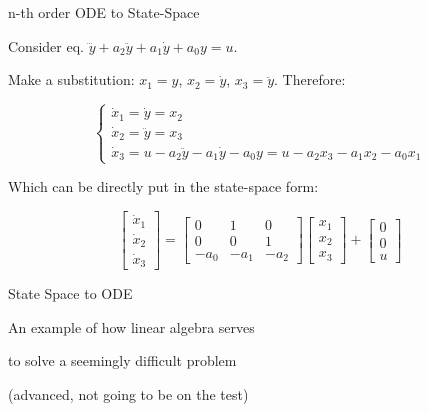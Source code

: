 \documentclass{beamer}
\begin{document}
\begin{frame}{n-th order ODE to State-Space}
\begin{flushleft}

Consider eq. $\dddot{y} + a_2 \ddot{y} + a_1 \dot{y} + a_0 y =u$.

\bigskip

Make a substitution: $x_1 = y$, $x_2 = \dot{y}$, $x_3 = \ddot{y}$. Therefore:

\begin{equation}
    \begin{cases}
        \dot{x}_1 = \dot{y} = x_2 \\
        \dot{x}_2 = \ddot{y} = x_3 \\
        \dot{x}_3 =  u-a_2 \ddot{y} - a_1 \dot{y} - a_0 y = 
        u-a_2 x_3 - a_1 x_2 - a_0 x_1
    \end{cases}
\end{equation}

Which can be directly put in the state-space form:

\begin{equation}
\begin{bmatrix}
\dot{x}_1 \\ \dot{x}_2 \\ \dot{x}_3
\end{bmatrix} 
=
\begin{bmatrix}
0 & 1 & 0 \\ 
0 & 0 & 1 \\
-a_0 & -a_1 & -a_2
\end{bmatrix} 
\begin{bmatrix}
x_1 \\ x_2 \\ x_3
\end{bmatrix} 
+ 
\begin{bmatrix}
0 \\ 0 \\ u
\end{bmatrix}
\end{equation}


\end{flushleft}
\end{frame}



\begin{frame}{State Space to ODE}
\centerline{An example of how linear algebra serves}
\centerline{to solve a seemingly difficult problem}
\bigskip
\centerline{(advanced, not going to be on the test)}
\end{frame}
\end{document}
